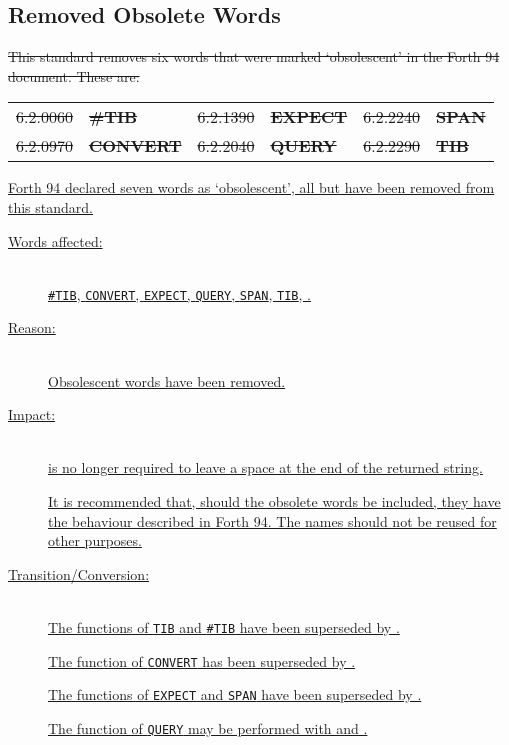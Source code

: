 \cbstart{}
\subsection{Removed Obsolete Words} %
\label{diff:ans:obsolete}
	\sout{This standard removes six words that were marked `obsolescent'
	in the Forth 94 document.  These are:}

\begin{tabular}{rl@{\qquad}rl@{\qquad}rl}
	\sout{6.2.0060}	& \sout{\textbf{\#TIB}}
&	\sout{6.2.1390}	& \sout{\textbf{EXPECT}}
&	\sout{6.2.2240}	& \sout{\textbf{SPAN}} \\
	\sout{6.2.0970}	& \sout{\textbf{CONVERT}}
&	\sout{6.2.2040}	& \sout{\textbf{QUERY}}
&	\sout{6.2.2290}	& \sout{\textbf{TIB}} \\
\end{tabular}

\uline{%
Forth 94 declared seven words as `obsolescent', all but  have
been removed from this standard.}

\begin{description}
\item[\uline{Words affected:}] ~\\
	\uline{\texttt{\#TIB},
  	\texttt{CONVERT},
  	\texttt{EXPECT},
  	\texttt{QUERY},
  	\texttt{SPAN},
  	\texttt{TIB},
  	.}
  
\item[\uline{Reason:}] ~\\
	\uline{Obsolescent words have been removed.}
  
\item[\uline{Impact:}] ~\\
	\uline{ is no longer required to leave a space at the
	  	end of the returned string.}

	\uline{It is recommended that, should the obsolete words be included,
	they have the behaviour described in Forth 94.  The names should not
	be reused for other purposes.}

\item[\uline{Transition/Conversion:}] ~\\
	\uline{The functions of \texttt{TIB} and \texttt{\#TIB} have been
  	superseded by .}
 
	\uline{The function of \texttt{CONVERT} has been superseded by
	.}

	\uline{The functions of \texttt{EXPECT} and \texttt{SPAN} have
	been superseded by .}

	\uline{The function of \texttt{QUERY} may be performed with
	 and .}
\end{description}

